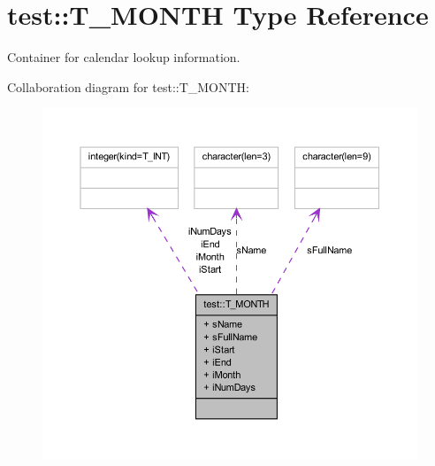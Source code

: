 \hypertarget{typetest_1_1_t___m_o_n_t_h}{
\section{test::T\_\-MONTH Type Reference}
\label{typetest_1_1_t___m_o_n_t_h}
}


Container for calendar lookup information.  




Collaboration diagram for test::T\_\-MONTH:\nopagebreak
\begin{figure}[H]
\begin{center}
\leavevmode
\includegraphics[width=388pt]{typetest_1_1_t___m_o_n_t_h__coll__graph}
\end{center}
\end{figure}
